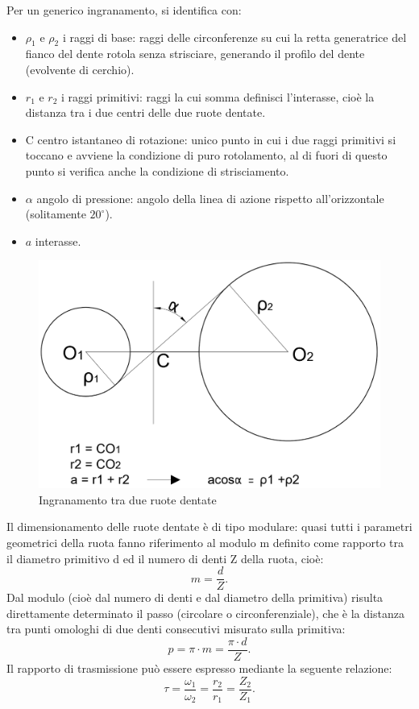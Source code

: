 Per un generico ingranamento, si identifica con:
\begin{itemize}
    \item $\rho_1$ e $\rho_2$ i raggi di base: raggi delle circonferenze su cui la retta generatrice del fianco del dente rotola senza strisciare, generando il profilo del dente (evolvente di cerchio).
    \item $r_1$ e $r_2$ i raggi primitivi: raggi la cui somma definisci l'interasse, cioè la distanza tra i due centri delle due ruote dentate. 
    \item C centro istantaneo di rotazione: unico punto in cui i due raggi primitivi si toccano e avviene la condizione di puro rotolamento, al di fuori di questo punto si verifica anche la condizione  di strisciamento. 
    \item $\alpha$ angolo di pressione: angolo della linea di azione rispetto all'orizzontale (solitamente $20^{\circ}$).
    \item $a$ interasse. 
\end{itemize}
\begin{figure}[h]
    \centering
    \includegraphics[scale=0.26]{Immagini/Ingranamento.png}
    \caption{Ingranamento tra due ruote dentate}
    \label{fig:Ingranamento}
\end{figure}

Il dimensionamento delle ruote dentate è di tipo modulare: quasi tutti i parametri geometrici della ruota fanno riferimento al modulo m definito come rapporto tra il diametro primitivo d ed il numero di denti Z della ruota, cioè:
\begin{equation}
    m=\frac{d}{Z}.
\end{equation}
Dal modulo (cioè dal numero di denti e dal diametro della primitiva) risulta direttamente determinato il passo (circolare o circonferenziale), che è la distanza tra punti omologhi di due denti consecutivi misurato sulla primitiva:
\begin{equation}
    p=\pi\cdot m=\frac{\pi\cdot d}{Z}.
\end{equation}
Il rapporto di trasmissione può essere espresso mediante la seguente relazione:
\begin{equation}
    \tau=\frac{\omega_1}{\omega_2}=\frac{r_2}{r_1}=\frac{Z_2}{Z_1}.
\end{equation}

